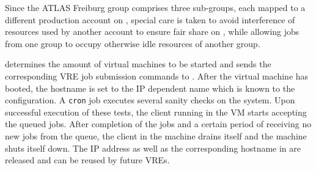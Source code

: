 Since the ATLAS Freiburg group comprises three sub-groups, each mapped
to a different production account on \NEMO, special care is taken to
avoid interference of resources used by another account to ensure fair share on \NEMO, while
allowing jobs from one group to occupy otherwise idle resources of another group.

\Roced determines the amount of virtual machines to be started and sends the
corresponding VRE job submission commands to \Moab.
After the virtual machine has booted, the hostname is set to the IP
dependent name which is known to the \Slurm configuration.
A \texttt{cron} job executes several sanity
checks on the system.
Upon successful execution of these tests, the \Slurm client
running in the VM starts accepting the queued jobs.
After completion of the jobs and a certain period of receiving no new jobs from the queue, the
\Slurm client in the machine drains itself and the machine
shuts itself down.
The IP address as well as the corresponding hostname in \Slurm
are released and can be reused by future VREs.
